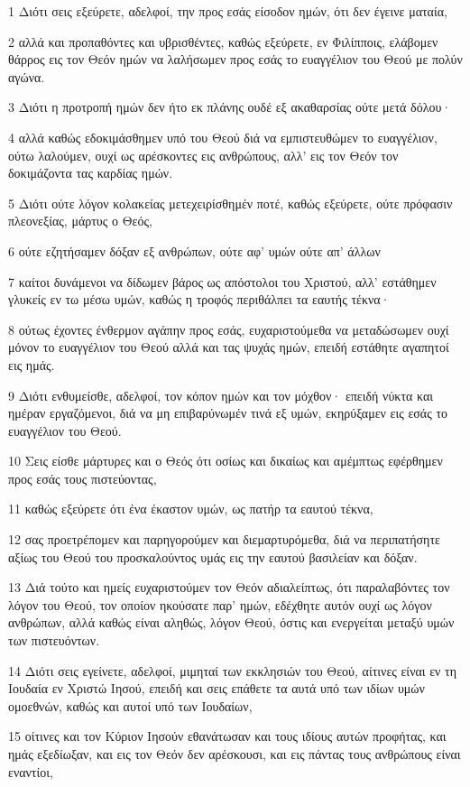 \par 1 Διότι σεις εξεύρετε, αδελφοί, την προς εσάς είσοδον ημών, ότι δεν έγεινε ματαία,
\par 2 αλλά και προπαθόντες και υβρισθέντες, καθώς εξεύρετε, εν Φιλίπποις, ελάβομεν θάρρος εις τον Θεόν ημών να λαλήσωμεν προς εσάς το ευαγγέλιον του Θεού με πολύν αγώνα.
\par 3 Διότι η προτροπή ημών δεν ήτο εκ πλάνης ουδέ εξ ακαθαρσίας ούτε μετά δόλου·
\par 4 αλλά καθώς εδοκιμάσθημεν υπό του Θεού διά να εμπιστευθώμεν το ευαγγέλιον, ούτω λαλούμεν, ουχί ως αρέσκοντες εις ανθρώπους, αλλ' εις τον Θεόν τον δοκιμάζοντα τας καρδίας ημών.
\par 5 Διότι ούτε λόγον κολακείας μετεχειρίσθημέν ποτέ, καθώς εξεύρετε, ούτε πρόφασιν πλεονεξίας, μάρτυς ο Θεός,
\par 6 ούτε εζητήσαμεν δόξαν εξ ανθρώπων, ούτε αφ' υμών ούτε απ' άλλων
\par 7 καίτοι δυνάμενοι να δίδωμεν βάρος ως απόστολοι του Χριστού, αλλ' εστάθημεν γλυκείς εν τω μέσω υμών, καθώς η τροφός περιθάλπει τα εαυτής τέκνα·
\par 8 ούτως έχοντες ένθερμον αγάπην προς εσάς, ευχαριστούμεθα να μεταδώσωμεν ουχί μόνον το ευαγγέλιον του Θεού αλλά και τας ψυχάς ημών, επειδή εστάθητε αγαπητοί εις ημάς.
\par 9 Διότι ενθυμείσθε, αδελφοί, τον κόπον ημών και τον μόχθον· επειδή νύκτα και ημέραν εργαζόμενοι, διά να μη επιβαρύνωμέν τινά εξ υμών, εκηρύξαμεν εις εσάς το ευαγγέλιον του Θεού.
\par 10 Σεις είσθε μάρτυρες και ο Θεός ότι οσίως και δικαίως και αμέμπτως εφέρθημεν προς εσάς τους πιστεύοντας,
\par 11 καθώς εξεύρετε ότι ένα έκαστον υμών, ως πατήρ τα εαυτού τέκνα,
\par 12 σας προετρέπομεν και παρηγορούμεν και διεμαρτυρόμεθα, διά να περιπατήσητε αξίως του Θεού του προσκαλούντος υμάς εις την εαυτού βασιλείαν και δόξαν.
\par 13 Διά τούτο και ημείς ευχαριστούμεν τον Θεόν αδιαλείπτως, ότι παραλαβόντες τον λόγον του Θεού, τον οποίον ηκούσατε παρ' ημών, εδέχθητε αυτόν ουχί ως λόγον ανθρώπων, αλλά καθώς είναι αληθώς, λόγον Θεού, όστις και ενεργείται μεταξύ υμών των πιστευόντων.
\par 14 Διότι σεις εγείνετε, αδελφοί, μιμηταί των εκκλησιών του Θεού, αίτινες είναι εν τη Ιουδαία εν Χριστώ Ιησού, επειδή και σεις επάθετε τα αυτά υπό των ιδίων υμών ομοεθνών, καθώς και αυτοί υπό των Ιουδαίων,
\par 15 οίτινες και τον Κύριον Ιησούν εθανάτωσαν και τους ιδίους αυτών προφήτας, και ημάς εξεδίωξαν, και εις τον Θεόν δεν αρέσκουσι, και εις πάντας τους ανθρώπους είναι εναντίοι,

